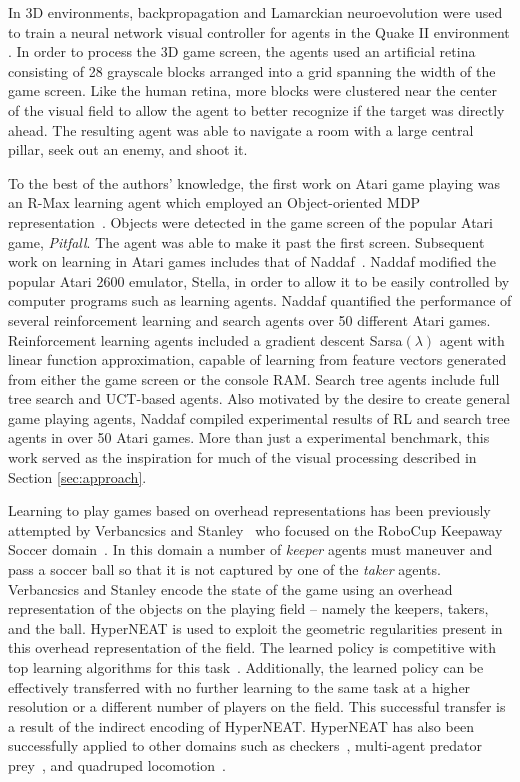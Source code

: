 \documentclass{sig-alternate}
\begin{document}
In 3D environments, backpropagation and Lamarckian neuroevolution were used to train a neural network visual controller for agents in the Quake II environment \cite{parker09}. In order to process the 3D game screen, the agents used an artificial retina consisting of 28 grayscale blocks arranged into a grid spanning the width of the game screen. Like the human retina, more blocks were clustered near the center of the visual field to allow the agent to better recognize if the target was directly ahead. The resulting agent was able to navigate a room with a large central pillar, seek out an enemy, and shoot it. 

To the best of the authors' knowledge, the first work on Atari game playing was an R-Max learning agent which employed an Object-oriented MDP representation~\cite{duik08}. Objects were detected in the game screen of the popular Atari game, \emph{Pitfall}. The agent was able to make it past the first screen. Subsequent work on learning in Atari games includes that of Naddaf~\cite{naddaf10}. Naddaf modified the popular Atari 2600 emulator, Stella, in order to allow it to be easily controlled by computer programs such as learning agents. Naddaf quantified the performance of several reinforcement learning and search agents over 50 different Atari games. Reinforcement learning agents included a gradient descent Sarsa$(\lambda)$ agent with linear function approximation, capable of learning from feature vectors generated from either the game screen or the console RAM. Search tree agents include full tree search and UCT-based agents. Also motivated by the desire to create general game playing agents, Naddaf compiled experimental results of RL and search tree agents in over 50 Atari games. More than just a experimental benchmark, this work served as the inspiration for much of the visual processing described in Section \ref{sec:approach}.

Learning to play games based on overhead representations has been previously attempted by Verbancsics and Stanley~\cite{verbancsics10} who focused on the RoboCup Keepaway Soccer domain~\cite{stone01}. In this domain a number of \textit{keeper} agents must maneuver and pass a soccer ball so that it is not captured by one of the \textit{taker} agents. Verbancsics and Stanley encode the state of the game using an overhead representation of the objects on the playing field -- namely the keepers, takers, and the ball. HyperNEAT is used to exploit the geometric regularities present in this overhead representation of the field.  The learned policy is competitive with top learning algorithms for this task~\cite{stone05}. Additionally, the learned policy can be effectively transferred with no further learning to the same task at a higher resolution or a different number of players on the field. This successful transfer is a result of the indirect encoding of HyperNEAT. HyperNEAT has also been successfully applied to other domains such as checkers~\cite{gauci08}, multi-agent predator prey~\cite{ambrosio08}, and quadruped locomotion~\cite{clune09}. 
\end{document}
